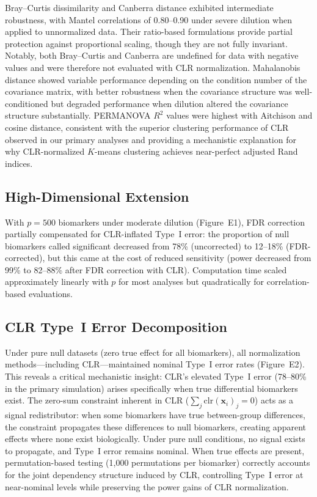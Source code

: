 \documentclass[12pt]{article}
\begin{document}
Bray--Curtis dissimilarity and Canberra distance exhibited intermediate robustness, with Mantel correlations of 0.80--0.90 under severe dilution when applied to unnormalized data. Their ratio-based formulations provide partial protection against proportional scaling, though they are not fully invariant. Notably, both Bray--Curtis and Canberra are undefined for data with negative values and were therefore not evaluated with CLR normalization. Mahalanobis distance showed variable performance depending on the condition number of the covariance matrix, with better robustness when the covariance structure was well-conditioned but degraded performance when dilution altered the covariance structure substantially. PERMANOVA $R^2$ values were highest with Aitchison and cosine distance, consistent with the superior clustering performance of CLR observed in our primary analyses and providing a mechanistic explanation for why CLR-normalized $K$-means clustering achieves near-perfect adjusted Rand indices.

\subsection{High-Dimensional Extension}

With $p = 500$ biomarkers under moderate dilution (Figure~E1), FDR correction partially compensated for CLR-inflated Type~I error: the proportion of null biomarkers called significant decreased from 78\% (uncorrected) to 12--18\% (FDR-corrected), but this came at the cost of reduced sensitivity (power decreased from 99\% to 82--88\% after FDR correction with CLR). Computation time scaled approximately linearly with $p$ for most analyses but quadratically for correlation-based evaluations.

\subsection{CLR Type~I Error Decomposition}

Under pure null datasets (zero true effect for all biomarkers), all normalization methods---including CLR---maintained nominal Type~I error rates (Figure~E2). This reveals a critical mechanistic insight: CLR's elevated Type~I error (78--80\% in the primary simulation) arises specifically when true differential biomarkers exist. The zero-sum constraint inherent in CLR ($\sum_j \mathrm{clr}(\mathbf{x}_i)_j = 0$) acts as a signal redistributor: when some biomarkers have true between-group differences, the constraint propagates these differences to null biomarkers, creating apparent effects where none exist biologically. Under pure null conditions, no signal exists to propagate, and Type~I error remains nominal. When true effects are present, permutation-based testing (1,000 permutations per biomarker) correctly accounts for the joint dependency structure induced by CLR, controlling Type~I error at near-nominal levels while preserving the power gains of CLR normalization.
\end{document}
